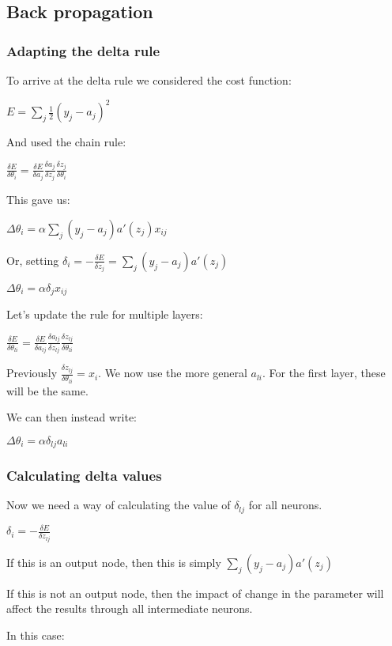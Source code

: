 
\subsection{Back propagation}

\subsubsection{Adapting the delta rule}

To arrive at the delta rule we considered the cost function:

\(E=\sum_j\frac{1}{2}(y_j-a_j)^2\)

And used the chain rule:

\(\frac{\delta E}{\delta \theta_i }=\frac{\delta E}{\delta a_j}\frac{\delta a_j}{\delta z_j}\frac{\delta z_j}{\delta \theta_i}\)

This gave us:

\(\Delta \theta_i=\alpha \sum_j(y_j-a_j)a'(z_j)x_{ij}\)

Or, setting \(\delta_i=-\frac{\delta E}{\delta z_j}=\sum_j(y_j-a_j)a'(z_j)\)

\(\Delta \theta_i=\alpha \delta_j x_{ij}\)

Let's update the rule for multiple layers:

\(\frac{\delta E}{\delta \theta_{li}}=\frac{\delta E}{\delta a_{lj}}\frac{\delta a_{lj}}{\delta z_{lj}}\frac{\delta z_{lj}}{\delta \theta_{li}}\)

Previously \(\frac{\delta z_{lj}}{\delta \theta_{li}}=x_i\). We now use the more general \(a_{li}\). For the first layer, these will be the same.

We can then instead write:

\(\Delta \theta_i=\alpha \delta_{lj} a_{li}\)

\subsubsection{Calculating delta values}

Now we need a way of calculating the value of \(\delta_{lj}\) for all neurons.

\(\delta_i=-\frac{\delta E}{\delta z_{lj}}\)

If this is an output node, then this is simply \(\sum_j(y_j-a_j)a'(z_j)\)

If this is not an output node, then the impact of change in the parameter will affect the results through all intermediate neurons.

In this case:

